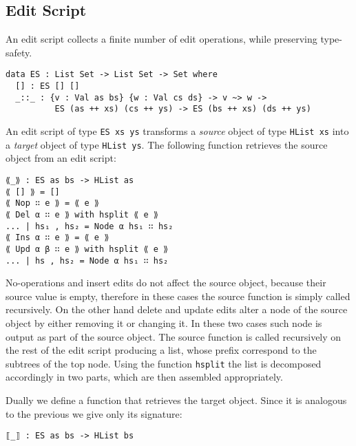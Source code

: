 \documentclass[preprint]{sigplanconf}
\begin{document}
	\subsection{Edit Script}
	An edit script collects a finite number of edit operations, 
	while preserving type-safety. 
\begin{verbatim}
data ES : List Set -> List Set -> Set where
  [] : ES [] []
  _::_ : {v : Val as bs} {w : Val cs ds} -> v ~> w -> 
          ES (as ++ xs) (cs ++ ys) -> ES (bs ++ xs) (ds ++ ys)
\end{verbatim}	
	An edit script of type \texttt{ES xs ys} transforms
	a \emph{source} object of type \texttt{HList xs} into
	a \emph{target} object of type \texttt{HList ys}. 
	The following function retrieves the source object from an edit script:			
\begin{verbatim}
⟪_⟫ : ES as bs -> HList as
⟪ [] ⟫ = []
⟪ Nop ∷ e ⟫ = ⟪ e ⟫
⟪ Del α ∷ e ⟫ with hsplit ⟪ e ⟫
... | hs₁ , hs₂ = Node α hs₁ ∷ hs₂
⟪ Ins α ∷ e ⟫ = ⟪ e ⟫
⟪ Upd α β ∷ e ⟫ with hsplit ⟪ e ⟫
... | hs , hs₂ = Node α hs₁ ∷ hs₂
\end{verbatim}
	No-operations and insert edits do not affect the source object,
	because their source value is empty, therefore in these cases the source 
	function is simply called recursively.
	On the other hand delete and update edits alter a node of the
	source object by either removing it or changing it.
	In these two cases such node is output as part of the source object.
	The source function is called recursively on the rest of the edit 
	script producing a list, whose prefix correspond to the subtrees of the
	top node. Using the function \texttt{hsplit} the list is decomposed 
	accordingly in two parts, which are then assembled appropriately.
	
	Dually we define a function that retrieves the target object.
	Since it is analogous to the previous we give only its signature:
	
\begin{verbatim}
⟦_⟧ : ES as bs -> HList bs
\end{verbatim}
\end{document}
